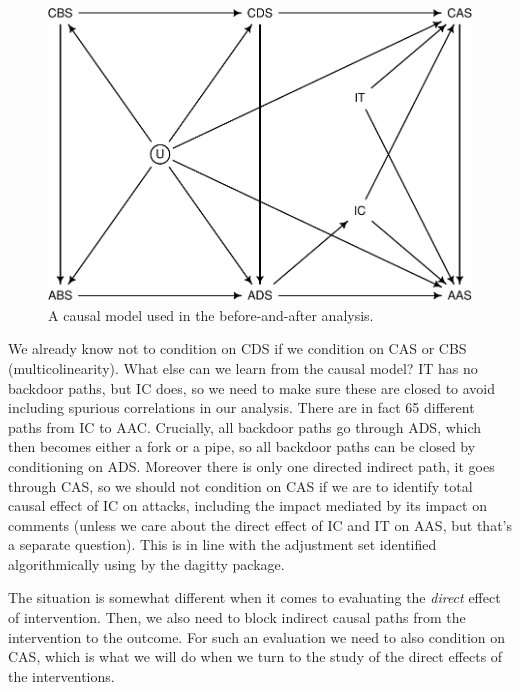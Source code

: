 \documentclass[
  10pt,
  dvipsnames, enabledeprecatedfontcommands]{scrartcl}
\begin{document}
\begin{figure}[H]

\begin{center}\includegraphics[width=1\linewidth]{technicalReport4_files/figure-latex/unnamed-chunk-5-1} \end{center}
\caption{A causal model used in the before-and-after analysis.}
\label{fig:causal}
\end{figure}

We already know not to condition on CDS if we condition on CAS or CBS
(multicolinearity). What else can we learn from the causal model?
\textsf{IT} has no backdoor paths, but \textsf{IC} does, so we need to
make sure these are closed to avoid including spurious correlations in
our analysis. There are in fact 65 different paths from \textsf{IC} to
\textsf{AAC}. Crucially, all backdoor paths go through \textsf{ADS},
which then becomes either a fork or a pipe, so all backdoor paths can be
closed by conditioning on \textsf{ADS}. Moreover there is only one
directed indirect path, it goes through \textsf{CAS}, so we should not
condition on \textsf{CAS} if we are to identify total causal effect of
\textsf{IC} on attacks, including the impact mediated by its impact on
comments (unless we care about the direct effect of \textsf{IC} and
\textsf{IT} on \textsf{AAS}, but that's a separate question). This is in
line with the adjustment set identified algorithmically using by the
\textsf{dagitty} package.

The situation is somewhat different when it comes to evaluating the
\emph{direct} effect of intervention. Then, we also need to block
indirect causal paths from the intervention to the outcome. For such an
evaluation we need to also condition on \textsf{CAS}, which is what we
will do when we turn to the study of the direct effects of the
interventions.
\end{document}
